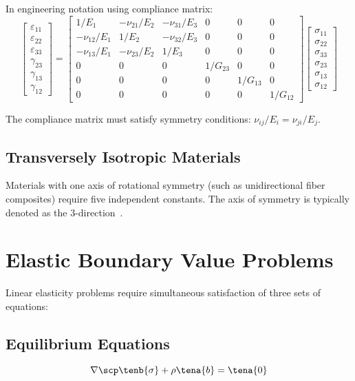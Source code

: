 In engineering notation using compliance matrix:
\begin{equation}
\begin{bmatrix}
\varepsilon_{11} \\
\varepsilon_{22} \\
\varepsilon_{33} \\
\gamma_{23} \\
\gamma_{13} \\
\gamma_{12}
\end{bmatrix}
=
\begin{bmatrix}
1/E_1 & -\nu_{21}/E_2 & -\nu_{31}/E_3 & 0 & 0 & 0 \\
-\nu_{12}/E_1 & 1/E_2 & -\nu_{32}/E_3 & 0 & 0 & 0 \\
-\nu_{13}/E_1 & -\nu_{23}/E_2 & 1/E_3 & 0 & 0 & 0 \\
0 & 0 & 0 & 1/G_{23} & 0 & 0 \\
0 & 0 & 0 & 0 & 1/G_{13} & 0 \\
0 & 0 & 0 & 0 & 0 & 1/G_{12}
\end{bmatrix}
\begin{bmatrix}
\sigma_{11} \\
\sigma_{22} \\
\sigma_{33} \\
\sigma_{23} \\
\sigma_{13} \\
\sigma_{12}
\end{bmatrix}
\end{equation}

The compliance matrix must satisfy symmetry conditions: $\nu_{ij}/E_i = \nu_{ji}/E_j$.

\subsection{Transversely Isotropic Materials}

Materials with one axis of rotational symmetry (such as unidirectional fiber composites) require five independent constants. The axis of symmetry is typically denoted as the 3-direction~\autocite{Sadd.2019}.

\section{Elastic Boundary Value Problems}

Linear elasticity problems require simultaneous satisfaction of three sets of equations:

\subsection{Equilibrium Equations}
\begin{equation}
\nabla \scp \tenb{\sigma} + \rho \tena{b} = \tena{0}
\end{equation}


